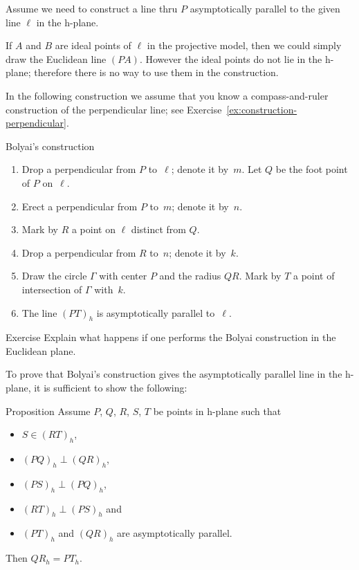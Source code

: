 Assume we need to construct a line thru $P$ asymptotically parallel to the given line $\ell$ in the h-plane.

If $A$ and $B$ are ideal points of $\ell$ in the projective model, 
then we could simply draw the Euclidean line $(PA)$.
However the ideal points do not lie in the h-plane; therefore there is no way to use them in the construction.

In the following construction we assume that you know a compass-and-ruler construction of the perpendicular line; see Exercise~\ref{ex:construction-perpendicular}.
\clearpage

\begin{thm}{Bolyai's construction}
\begin{enumerate}
\item Drop a perpendicular from $P$ to~$\ell$; denote it by~$m$.
Let $Q$ be the foot point of $P$ on~$\ell$.
\item Erect a perpendicular from $P$ to~$m$; denote it by~$n$.
\item Mark by $R$ a point on $\ell$ distinct from $Q$.
\item Drop a perpendicular from $R$ to~$n$; denote it by~$k$. 
\item Draw the circle $\Gamma$ with center $P$ and the radius $QR$. 
Mark by $T$ a point of intersection of $\Gamma$ with~$k$.
\item The line $(PT)_h$ is asymptotically parallel to~$\ell$.
\end{enumerate}
\end{thm}

\begin{thm}{Exercise}\label{ex:Boyai-in-Euclid}
Explain what happens if one performs the Bolyai construction in the Euclidean plane.
\end{thm}

To prove that Bolyai's construction gives the asymptotically parallel line in the h-plane,
it is sufficient to show the following:

\begin{thm}{Proposition}\label{prop:boyai}
Assume $P$, $Q$, $R$, $S$, $T$ be points in h-plane
such that 
\begin{itemize}
\item $S\in (RT)_h$,
\item $(PQ)_h\perp (QR)_h$,
\item $(PS)_h\perp(PQ)_h$,
\item $(RT)_h\perp (PS)_h$ and 
\item $(PT)_h$ and $(QR)_h$ are asymptotically parallel.
\end{itemize}
Then $QR_h=PT_h$.
\end{thm}


